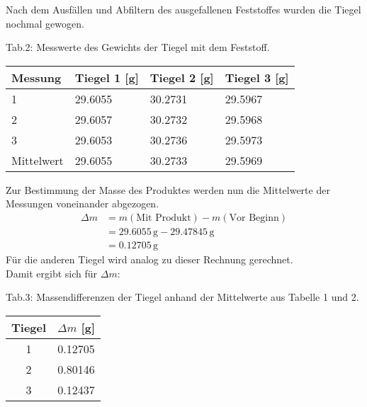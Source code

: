 \documentclass[12pt]{scrartcl} %
\begin{document}
Nach dem Ausfällen und Abfiltern des ausgefallenen Feststoffes wurden die Tiegel nochmal gewogen.
\begin{center}
  Tab.2: Messwerte des Gewichts der Tiegel mit dem Feststoff.\\
  \begin{tabular}{l l l l}
    \hline
    Messung & Tiegel 1 [g] & Tiegel 2 [g] & Tiegel 3 [g]\\
    \hline
    1&29.6055&30.2731&29.5967\\
    2&29.6057&30.2732&29.5968\\
    3&29.6053&30.2736&29.5973\\
    \hline
    Mittelwert&29.6055 & 30.2733 & 29.5969\\
    \hline
  \end{tabular}
\end{center}

Zur Bestimmung der Masse des Produktes werden nun die Mittelwerte der Messungen voneinander abgezogen.\\
\begin{align*}
  \Delta m &= m(\text{Mit Produkt}) - m(\text{Vor Beginn})\\
  &= 29.6055\,\mathrm{g} - 29.47845\,\mathrm{g}\\
  &= 0.12705\,\mathrm{g}
\end{align*}
Für die anderen Tiegel wird analog zu dieser Rechnung gerechnet.\\
Damit ergibt sich für $\Delta m$:\\
\begin{center}
  Tab.3: Massendifferenzen der Tiegel anhand der Mittelwerte aus Tabelle 1 und 2.\\
  \begin{tabular}{c c}
    \hline
    Tiegel&$\Delta m$ [g]\\
    \hline
    1&0.12705\\
    2&0.80146\\
    3&0.12437\\
    \hline
  \end{tabular}
\end{center}
\end{document}
